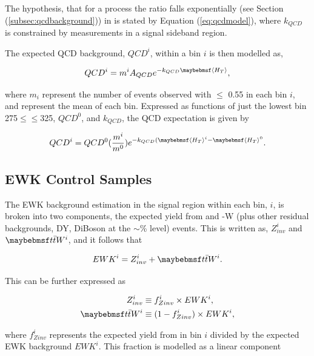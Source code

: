 The hypothesis, that for a process the \alphat ratio falls exponentially (see Section (\ref{subsec:qcdbackground})) in \theht is stated by Equation (\ref{eq:qcdmodel}), where $k_{QCD}$ is constrained by measurements in a signal sideband region. 

The expected QCD background, $QCD^{i}$, within a bin $i$ is then modelled as,

\begin{equation}
QCD^{i} = m^{i}A_{QCD}e^{-k_{QCD}\meanht},
\end{equation}

where $m_{i}$ represent the number of events observed with \alphat $\leq$ 0.55 in each \theht bin $i$, and \meanht represent the mean \theht of each bin. Expressed as functions of just the lowest \theht bin 275$\leq$\theht$\leq$325, $QCD^{0}$, and $k_{QCD}$, the QCD expectation is given by

\begin{equation}
QCD^{i} = QCD^{0}(\frac{m^{i}}{m^{0}})e^{-k_{QCD}(\meanht^{i}-\meanht^{0}}.
\end{equation} 

\subsection{\ac{EWK} Control Samples}
\label{subsec:ewkmodel}

The \ac{EWK} background estimation in the signal region within each bin, $i$, is broken into two components, the expected yield from \zinv and \ttbar-W (plus other residual backgrounds, DY, DiBoson at the $\sim$\% level) events. This is written as, $Z^{i}_{inv}$ and $\ttbar W^{i}$, and it follows that 

\begin{equation}
EWK^{i} = Z^{i}_{inv} + \ttbar W^{i}.
\end{equation}

This can be further expressed as

\begin{align}
\label{eq:zinvcontribution}
Z^{i}_{inv} &\equiv f^{i}_{Zinv} \times EWK^{i}, \\
\label{eq:ttwcontribution}
\ttbar W^{i} &\equiv (1 - f^{i}_{Zinv}) \times EWK^{i},
\end{align}

where $f^{i}_{Zinv}$ represents the expected yield from \zinv in bin $i$ divided by the expected \ac{EWK} background $EWK^{i}$. This fraction is modelled as a linear component

